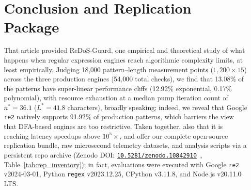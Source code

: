 \documentclass{ieeeaccess}
\begin{document}
\begin{table}[t]
\centering
\caption{Replication Package Artifact Inventory and Schema Description}
\label{tab:rep_inventory}
\end{table}

\section{Conclusion and Replication Package}
That article provided ReDoS-Guard, one empirical and theoretical study of what happens when regular expression engines reach algorithmic complexity limits, at least empirically. Judging 18,000 pattern--length measurement points ($1{,}200 \times 15$) across the three production engines (54,000 total checks), we find that 13.08\% of the patterns have super-linear performance cliffs (12.92\% exponential, 0.17\% polynomial), with resource exhaustion at a median pump iteration count of $n^* = 36.1$ ($L^* = 41.8$ characters), broadly speaking; indeed, we reveal that Google \texttt{re2} natively supports 91.92\% of production patterns, which barriers the view that DFA-based engines are too restrictive. Taken together, also that it is reaching latency speedups above $10^5\times$, and offer our complete open-source replication bundle, raw microsecond telemetry datasets, and analysis scripts via a persistent repo archive (Zenodo DOI: \href{https://doi.org/10.5281/zenodo.10842910}{\texttt{10.5281/zenodo.10842910}}~\cite{replication_pkg}, Table~\ref{tab:rep_inventory}); in fact, evaluations were executed with Google \texttt{re2} v2024-03-01, Python \texttt{regex} v2023.12.25, CPython v3.11.8, and Node.js v20.11.0 LTS.
\end{document}
